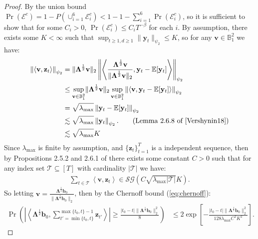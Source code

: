 \begin{proof}

By the union bound $\Pr(\mathcal{E}^c) = 1 - P(\cup_{i=1}^6 \mathcal{E}^c_i) < 1 - 1 - \sum_{i=1}^6 \Pr(\mathcal{E}^c_i)$, so it is sufficient to show that for some $C_i > 0$, $\Pr(\mathcal{E}^c_i) \leq C_i T^{-\beta}$ for each $i$. By assumption, there exists some $K < \infty$ such that $\sup_{t\geq 1, d\geq 1} \lVert \mathbf{y}_t\rVert_{\psi_2} \leq K$, so for any $\mathbf{v} \in \mathbb{B}^2_1$ we have:
\begin{align*}
    \left\lVert\left\langle\mathbf{v}, \mathbf{z}_t \right\rangle\right\rVert_{\psi_2} &= \lVert \boldsymbol{\Lambda}^{\frac{1}{2}}\mathbf{v}\rVert_{2}\left\lVert\left\langle\frac{\boldsymbol{\Lambda}^{\frac{1}{2}}\mathbf{v}}{\lVert \boldsymbol{\Lambda}^{\frac{1}{2}}\mathbf{v} \rVert_2}, \mathbf{y}_t - \E[\mathbf{y}_t] \right\rangle\right\rVert_{\psi_2} \\
    &\leq \sup_{\mathbf{v} \in  \mathbb{B}^2_1}\lVert\boldsymbol{\Lambda}^{\frac{1}{2}}\mathbf{v}\rVert_{2} \sup_{\mathbf{v} \in  \mathbb{B}^2_1} \left\lVert\left\langle\mathbf{v}, \mathbf{y}_t - \E[\mathbf{y}_t] \right\rangle\right\rVert_{\psi_2}\\
    &= \sqrt{\lambda_{\max}} \left\lVert\mathbf{y}_t - \E[\mathbf{y}_t] \right\rVert_{\psi_2} \\
    &\lesssim \sqrt{\lambda_{\max}} \left\lVert\mathbf{y}_t \right\rVert_{\psi_2}. \tag{Lemma 2.6.8 of \cite{Vershynin18}} \\
    &\lesssim \sqrt{\lambda_{\max}} K
\end{align*}
Since $\lambda_{\max}$ is finite by assumption, and $\{\mathbf{z}_t\}_{t=1}^T$ is a independent sequence, then by Propositions 2.5.2 and 2.6.1 of \cite{Vershynin18} there exists some constant $C>0$ such that for any index set $\mathcal{T} \subseteq [T]$ with cardinality $|\mathcal{T}|$ we have: 
\begin{align*}
    \sum_{t \in \mathcal{T}} \left\langle\mathbf{v}, \mathbf{z}_t \right\rangle \in \mathcal{SG}\left(C\sqrt{\lambda_{\max}|\mathcal{T}|} K\right).
\end{align*}
So letting $\mathbf{v} = \frac{\boldsymbol{\Lambda}^{\frac{1}{2}}\mathbf{b}_0}{\lVert \boldsymbol{\Lambda}^{\frac{1}{2}}\mathbf{b}_0 \rVert_2}$, then by the Chernoff bound (\ref{eq:chernoff}): 
\begin{align*}
    \Pr\left(\left|\left\langle\boldsymbol{\Lambda}^{\frac{1}{2}}\mathbf{b}_0, \sum_{t'=\min\{t_0,t\}}^{\max\{t_0,t\}-1}\mathbf{z}_{t'} \right\rangle\right| \geq \frac{|t_0-t| \lVert\boldsymbol{\Lambda}^{\frac{1}{2}} \mathbf{b}_0\rVert_2^2}{8}\right) &\leq 2\exp\left[-\frac{|t_0-t|\lVert\boldsymbol{\Lambda}^{\frac{1}{2}} \mathbf{b}_0\rVert^2_2}{128\lambda_{\max}C^2K^2}\right].

\end{align*}
\end{proof}
